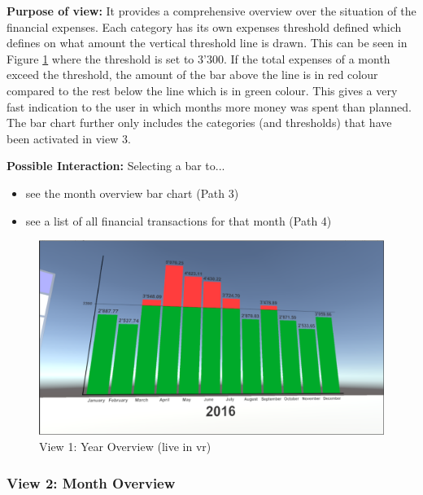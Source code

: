 \textbf{Purpose of view:} It provides a comprehensive overview over the situation of the financial expenses. Each category has its own expenses threshold defined which defines on what amount the vertical threshold line is drawn. This can be seen in Figure \ref{fig:unityview1} where the threshold is set to 3'300. If the total expenses of a month exceed the threshold, the amount of the bar above the line is in red colour compared to the rest below the line which is in green colour. This gives a very fast indication to the user in which months more money was spent than planned. The bar chart further only includes the categories (and thresholds) that have been activated in view 3.

\textbf{Possible Interaction:} Selecting a bar to...
\begin{itemize}[noitemsep,nolistsep]
	\item see the month overview bar chart (Path 3)
	\item see a list of all financial transactions for that month (Path 4)
\end{itemize}

\begin{figure}[h]
	\begin{center}
		\includegraphics[width=14cm]{03_Figures/08_Development/View1_YearOverview.png}
		\caption{View 1: Year Overview (live in \gls{vr})}
		\label{fig:unityview1}
	\end{center}
\end{figure}


\subsubsection{View 2: Month Overview}

